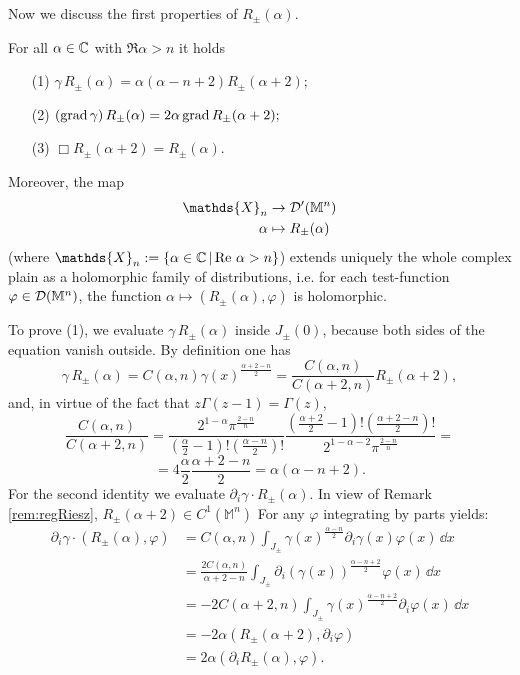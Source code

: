 \noindent Now we discuss the first properties of $R_\pm(\alpha)$.
\begin{prop}
	For all $\alpha\in{\mathbb C}$ with $\Re\alpha>n$ it holds
	\begin{enumerate}
		\item[(1)] $\gamma\, R_\pm(\alpha) = \alpha(\alpha-n+2) R_\pm(\alpha+2);$
		\item[(2)] $(\operatorname{grad} \gamma)\, R_\pm(\alpha) = 2\alpha \operatorname{grad} R_\pm(\alpha+2);$
		\item[(3)] $\Box R_\pm(\alpha+2)  = R_\pm(\alpha)$.
	\end{enumerate}
	Moreover, the map
\begin{equation*}
\begin{aligned}
\mathds{X}_n &\to\mD'(\mathbb{M}^n)\\
\alpha &\mapsto R_\pm(\alpha) 
\end{aligned}
\end{equation*}
	(where $\mathds{X}_n:=\{\alpha\in\mC\,|\,\Re\alpha>n\}$) extends uniquely the whole complex plain as a holomorphic family of distributions, i.e. for each test-function $\varphi\in\mathcal{D}(\mathbb{M}^n)$, the function $\alpha\mapsto (R_\pm(\alpha),\varphi)$ is holomorphic.
	\label{prop:firstRiesz}
\end{prop}
\Proof To prove (1), we evaluate $\gamma\,R_\pm(\alpha)$ inside $J_\pm(0)$, because both sides of the equation vanish outside. By definition one has
\[	\gamma\, R_\pm(\alpha) =	C(\alpha,n)\gamma(x)^{\frac{\alpha+2-n}{2}}	=\frac{C(\alpha,n)}{C(\alpha+2,n)}R_\pm(\alpha+2),	\]
and, in virtue of the fact that $z\Gamma(z-1)=\Gamma(z)$,
\[\frac{C(\alpha,n)}{C(\alpha+2,n)}=\frac{2^{1-\alpha}\pi^{\frac{2-n}{n}}}{(\frac{\alpha}{2}-1)!(\frac{\alpha-n}{2})!}\frac{(\frac{\alpha+2}{2}-1)!(\frac{\alpha+2-n}{2})!}{2^{1-\alpha-2}\pi^{\frac{2-n}{n}}}= \]
\[	=4\frac{\alpha}{2}\frac{\alpha+2-n}{2}=\alpha(\alpha-n+2).		\]
For the second identity we evaluate $\partial_i\gamma\cdot R_\pm(\alpha)$. In view of Remark \ref{rem:regRiesz}, $R_\pm(\alpha+2)\in C^1(\mathbb{M}^n)$ For any $\varphi$ integrating by parts yields:
\[	\begin{aligned}
\partial_i\gamma\cdot 	(R_\pm(\alpha),\varphi)&=C(\alpha,n)\int_{J_\pm}\gamma(x)^{\frac{\alpha-n}{2}}\partial_i\gamma(x)\varphi(x)\,\dd x\\
&=\frac{2C(\alpha,n)}{\alpha+2-n}\int_{J_\pm}\partial_i(\gamma(x))^{\frac{\alpha-n+2}{2}}\varphi(x)\,\dd x\\
&=-2C(\alpha+2,n)\int_{J_\pm}\gamma(x)^{\frac{\alpha-n+2}{2}}\partial_i\varphi(x)\,\dd x\\
&=-2\alpha(R_\pm(\alpha+2),\partial_i\varphi)\\
&=2\alpha(\partial_iR_\pm(\alpha),\varphi).
\end{aligned}	\]
